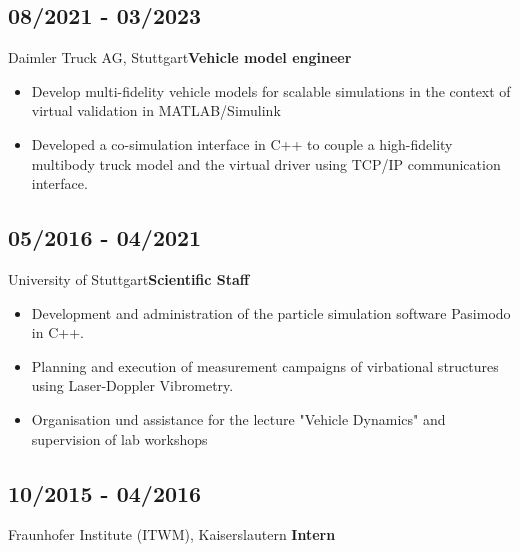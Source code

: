 \documentclass{mycv}
\begin{document}
\begin{paracol}{2}
{    \subsection{08/2021 - 03/2023}{Daimler Truck AG, Stuttgart}{\bfseries Vehicle model engineer}
          \begin{itemize}
              \item Develop multi-fidelity vehicle models for scalable simulations in the context of
          virtual validation in MATLAB/Simulink
            \item Developed a co-simulation interface in C++ to couple a high-fidelity
                multibody truck model and the virtual driver using
                TCP/IP communication interface.
          \end{itemize}

    \subsection{05/2016 - 04/2021}{University of Stuttgart}{{\bfseries Scientific Staff}}
           \begin{itemize}
               \item Development and administration of the particle simulation
                   software Pasimodo in C++.
               \item Planning and execution of measurement campaigns of
                   virbational structures using Laser-Doppler Vibrometry.
               \item Organisation und assistance for the lecture "Vehicle
                   Dynamics" and supervision of lab workshops
           \end{itemize}

    \subsection{10/2015 - 04/2016}{Fraunhofer Institute (ITWM), Kaiserslautern}
        {{\bfseries Intern}}\\
}
\end{paracol}
\end{document}
